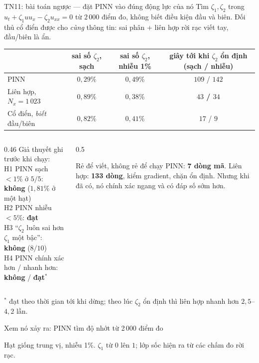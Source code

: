 \documentclass[aspectratio=169,11pt]{beamer}
\newcommand{\hoathinh}[2][0.62\textheight]{%
  \animategraphics[height=#1,controls=play,loop,autoplay]{10}{anim/#2}{}{}}
\newcommand{\good}[1]{\textcolor{good}{\textbf{#1}}}
\newcommand{\bad}[1]{\textcolor{bad}{\textbf{#1}}}
\begin{document}
\begin{frame}{TN11: bài toán ngược --- đặt PINN vào đúng động lực của nó}
\footnotesize
Tìm $\zeta_1, \zeta_2$ trong $u_t + \zeta_1 u u_x - \zeta_2 u_{xx} = 0$ từ
$2\,000$ điểm đo, \alert{không biết điều kiện đầu và biên}. Đối thủ cổ điển được
cho \emph{cùng} thông tin: sai phân + liên hợp rời rạc viết tay, đầu/biên là ẩn.

\smallskip
\begin{tabular}{@{}lccc@{}}
\toprule
& sai số $\zeta_2$, sạch & sai số $\zeta_2$, nhiễu 1\% & giây tới khi $\zeta_2$ ổn định (sạch / nhiễu) \\
\midrule
PINN & \good{$0{,}29\%$} & $0{,}49\%$ & $109$ / $142$ \\
Liên hợp, $N_x = 1\,023$ & $0{,}89\%$ & \good{$0{,}38\%$} & \good{$43$ / $34$} \\
Cổ điển, \emph{biết} đầu/biên & $0{,}82\%$ & $0{,}41\%$ & $17$ / $9$ \\
\bottomrule
\end{tabular}

\smallskip
\begin{columns}[T]
\begin{column}{0.46\textwidth}
\scriptsize
Giả thuyết ghi \alert{trước khi chạy}:\\
H1 PINN sạch $< 1\%$ ở $5/5$: \bad{không} ($1{,}81\%$ ở một hạt)\\
H2 PINN nhiễu $< 5\%$: \good{đạt}\\
H3 ``$\zeta_2$ luôn sai hơn $\zeta_1$ một bậc'': \bad{không} ($8/10$)\\
H4 PINN chính xác hơn / nhanh hơn: \bad{không} / \good{đạt}${}^{*}$
\end{column}
\begin{column}{0.5\textwidth}
\begin{alertblock}{Rẻ để viết, không rẻ để chạy}
\footnotesize PINN: \good{7 dòng mã}. Liên hợp: \bad{133 dòng}, kiểm gradient,
chặn ổn định. Nhưng khi đã có, nó chính xác ngang và có đáp số sớm hơn.
\end{alertblock}
\end{column}
\end{columns}

\vspace{2pt}
{\scriptsize ${}^{*}$ đạt theo thời gian tới khi dừng; theo lúc $\zeta_2$ ổn định
thì liên hợp nhanh hơn $2{,}5$--$4{,}2$ lần.}
\end{frame}

\begin{frame}{Xem nó xảy ra: PINN tìm độ nhớt từ 2\,000 điểm đo}
\centering
\hoathinh[0.68\textheight]{tn11_nhan_dang}

\footnotesize Hạt giống trung vị, nhiễu 1\%. $\zeta_1$ từ $0$ lên $1$; lớp sốc
hiện ra từ các chấm đo rời rạc.
\end{frame}
\end{document}
